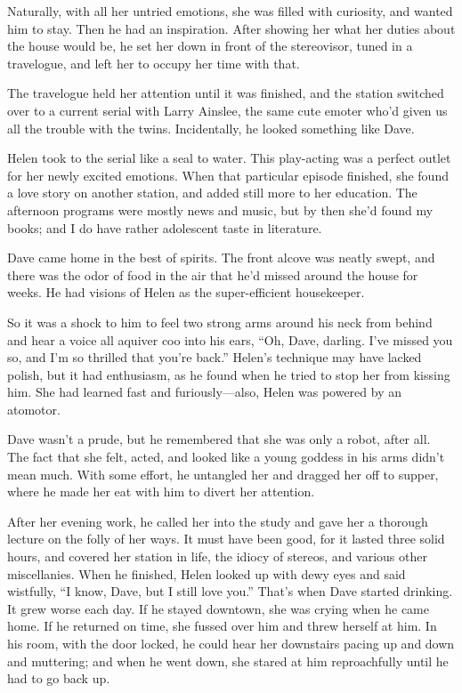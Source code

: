 \documentclass{article}
\begin{document}
Naturally, with all her untried emotions, she was filled with curiosity, and wanted him to stay. Then he had an inspiration. After showing her what her duties about the house would be, he set her down in front of the stereovisor, tuned in a travelogue, and left her to occupy her time with that.

The travelogue held her attention until it was finished, and the station switched over to a current serial with Larry Ainslee, the same cute emoter who’d given us all the trouble with the twins. Incidentally, he looked something like Dave.

Helen took to the serial like a seal to water. This play-acting was a perfect outlet for her newly excited emotions. When that particular episode finished, she found a love story on another station, and added still more to her education. The afternoon programs were mostly news and music, but by then she’d found my books; and I do have rather adolescent taste in literature.

Dave came home in the best of spirits. The front alcove was neatly swept, and there was the odor of food in the air that he’d missed around the house for weeks. He had visions of Helen as the super-efficient housekeeper.

So it was a shock to him to feel two strong arms around his neck from behind and hear a voice all aquiver coo into his ears, “Oh, Dave, darling. I’ve missed you so, and I’m so thrilled that you’re back.” Helen’s technique may have lacked polish, but it had enthusiasm, as he found when he tried to stop her from kissing him. She had learned fast and furiously—also, Helen was powered by an atomotor.

Dave wasn’t a prude, but he remembered that she was only a robot, after all. The fact that she felt, acted, and looked like a young goddess in his arms didn’t mean much. With some effort, he untangled her and dragged her off to supper, where he made her eat with him to divert her attention.

After her evening work, he called her into the study and gave her a thorough lecture on the folly of her ways. It must have been good, for it lasted three solid hours, and covered her station in life, the idiocy of stereos, and various other miscellanies. When he finished, Helen looked up with dewy eyes and said wistfully, “I know, Dave, but I still love you.” That’s when Dave started drinking. It grew worse each day. If he stayed downtown, she was crying when he came home. If he returned on time, she fussed over him and threw herself at him. In his room, with the door locked, he could hear her downstairs pacing up and down and muttering; and when he went down, she stared at him reproachfully until he had to go back up.
\end{document}
